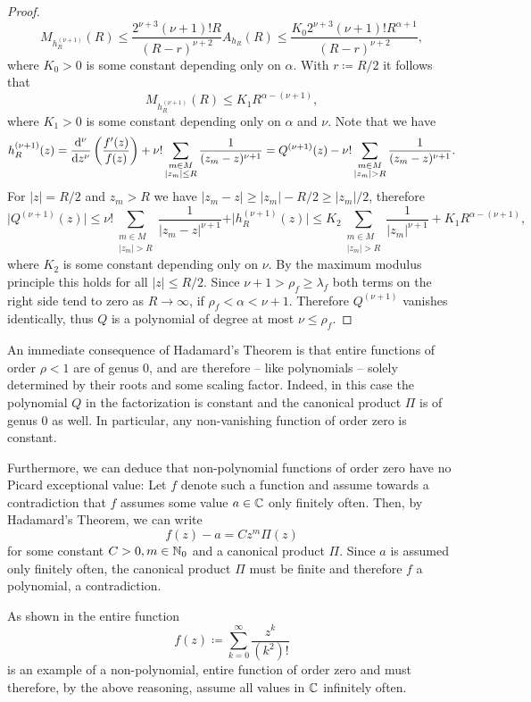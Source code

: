 \begin{proof}
    $$ M_{h_R^{(\nu + 1)}}(R) \leq \frac{2^{\nu + 3} (\nu + 1)! R}{(R - r)^{\nu + 2}} A_{h_R}(R) \leq \frac{K_0 2^{\nu + 3} (\nu + 1)! R^{\alpha + 1}}{(R - r)^{\nu + 2}}, $$
    where $K_0 > 0$ is some constant depending only on $\alpha$. With $r \coloneqq R / 2$ it follows that
    $$ M_{h_R^{(\nu + 1)}}(R) \leq K_1 R^{\alpha - (\nu + 1)}, $$
    where $K_1 > 0$ is some constant depending only on $\alpha$ and $\nu$. Note that we have
    $$ h_R^{(\nu + 1)}(z) = \frac{\mathrm{d}^{\nu}}{\mathrm{d} {z}^{\nu}} \left( \frac{f'(z)}{f(z)} \right) + \nu! \sum_{\substack{m \in M \\ \vert z_m \vert \leq R}} \frac{1}{(z_m - z)^{\nu + 1}} = Q^{(\nu + 1)}(z) - \nu! \sum_{\substack{m \in M \\ \vert z_m \vert > R}} \frac{1}{(z_m - z)^{\nu + 1}}. $$
    For $\vert z \vert = R / 2$ and $z_m > R$ we have $\vert z_m - z \vert \geq \vert z_m \vert - R / 2 \geq \vert z_m \vert / 2$, therefore
    $$ \vert Q^{(\nu+1)}(z) \vert \leq \nu! \sum_{\substack{m \in M \\ \vert z_m \vert > R}} \frac{1}{\vert z_m - z \vert^{\nu + 1}} + \vert h_R^{(\nu + 1)}(z) \vert \leq K_2 \sum_{\substack{m \in M \\ \vert z_m \vert > R}} \frac{1}{\vert z_m \vert^{\nu + 1}} + K_1 R^{\alpha - (\nu + 1)}, $$
    where $K_2$ is some constant depending only on $\nu$. By the maximum modulus principle this holds for all $\vert z \vert \leq R / 2$. Since $\nu + 1 > \rho_f \geq \lambda_f$ both terms on the right side tend to zero as $R \to \infty$, if $\rho_f < \alpha < \nu + 1$. Therefore $Q^{(\nu + 1)}$ vanishes identically, thus $Q$ is a polynomial of degree at most $\nu \leq \rho_f$.
\end{proof}

\begin{remark} \label{rem:consequences-hadamard}
    An immediate consequence of Hadamard's Theorem is that entire functions of order $\rho < 1$ are of genus $0$, and are therefore -- like polynomials -- solely determined by their roots and some scaling factor. Indeed, in this case the polynomial $Q$ in the factorization is constant and the canonical product $\Pi$ is of genus $0$ as well. In particular, any non-vanishing function of order zero is constant.

    Furthermore, we can deduce that non-polynomial functions of order zero have no Picard exceptional value: Let $f$ denote such a function and assume towards a contradiction that $f$ assumes some value $a \in \mathbb{C}$ only finitely often. Then, by Hadamard's Theorem, we can write
    $$ f(z) - a = C z^m \Pi(z) $$
    for some constant $C > 0, m \in \mathbb{N}_0$ and a canonical product $\Pi$. Since $a$ is assumed only finitely often, the canonical product $\Pi$ must be finite and therefore $f$ a polynomial, a contradiction.
    
    As shown in  the entire function
    $$ f(z) \coloneqq \sum_{k=0}^\infty \frac{z^k}{(k^2)!} $$
    is an example of a non-polynomial, entire function of order zero and must therefore, by the above reasoning, assume all values in $\mathbb{C}$ infinitely often.
\end{remark}

